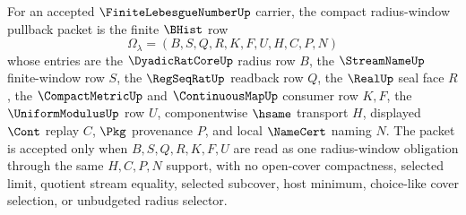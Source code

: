 \begin{definition}
\label{def:finite-lebesgue-number-compact-radius-window-pullback}
For an accepted $\FiniteLebesgueNumberUp$ carrier, the compact radius-window pullback packet is the finite $\BHist$ row
$$
\Omega_{\lambda}=(B,S,Q,R,K,F,U,H,C,P,N)
$$
whose entries are the $\DyadicRatCoreUp$ radius row $B$, the $\StreamNameUp$ finite-window row $S$, the $\RegSeqRatUp$ readback row $Q$, the $\RealUp$ seal face $R$, the $\CompactMetricUp$ and $\ContinuousMapUp$ consumer row $K,F$, the $\UniformModulusUp$ row $U$, componentwise $\hsame$ transport $H$, displayed $\Cont$ replay $C$, $\Pkg$ provenance $P$, and local $\NameCert$ naming $N$. The packet is accepted only when $B,S,Q,R,K,F,U$ are read as one radius-window obligation through the same $H,C,P,N$ support, with no open-cover compactness, selected limit, quotient stream equality, selected subcover, host minimum, choice-like cover selection, or unbudgeted radius selector.
\end{definition}

